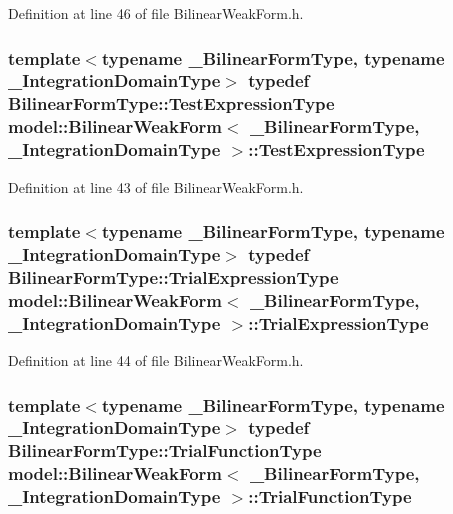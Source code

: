 Definition at line 46 of file Bilinear\+Weak\+Form.\+h.

\hypertarget{structmodel_1_1_bilinear_weak_form_acdfc10bd49650e2c484d222172834edd}{}
\subsubsection[{Test\+Expression\+Type}]{\setlength{\rightskip}{0pt plus 5cm}template$<$typename \+\_\+\+Bilinear\+Form\+Type, typename \+\_\+\+Integration\+Domain\+Type$>$ typedef Bilinear\+Form\+Type\+::\+Test\+Expression\+Type {\bf model\+::\+Bilinear\+Weak\+Form}$<$ \+\_\+\+Bilinear\+Form\+Type, \+\_\+\+Integration\+Domain\+Type $>$\+::{\bf Test\+Expression\+Type}}\label{structmodel_1_1_bilinear_weak_form_acdfc10bd49650e2c484d222172834edd}


Definition at line 43 of file Bilinear\+Weak\+Form.\+h.

\hypertarget{structmodel_1_1_bilinear_weak_form_a259b56acf743f646cc86607685f70791}{}
\subsubsection[{Trial\+Expression\+Type}]{\setlength{\rightskip}{0pt plus 5cm}template$<$typename \+\_\+\+Bilinear\+Form\+Type, typename \+\_\+\+Integration\+Domain\+Type$>$ typedef Bilinear\+Form\+Type\+::\+Trial\+Expression\+Type {\bf model\+::\+Bilinear\+Weak\+Form}$<$ \+\_\+\+Bilinear\+Form\+Type, \+\_\+\+Integration\+Domain\+Type $>$\+::{\bf Trial\+Expression\+Type}}\label{structmodel_1_1_bilinear_weak_form_a259b56acf743f646cc86607685f70791}


Definition at line 44 of file Bilinear\+Weak\+Form.\+h.

\hypertarget{structmodel_1_1_bilinear_weak_form_a3c646b6d23c1e5dc29480fc04b6c9587}{}
\subsubsection[{Trial\+Function\+Type}]{\setlength{\rightskip}{0pt plus 5cm}template$<$typename \+\_\+\+Bilinear\+Form\+Type, typename \+\_\+\+Integration\+Domain\+Type$>$ typedef Bilinear\+Form\+Type\+::\+Trial\+Function\+Type {\bf model\+::\+Bilinear\+Weak\+Form}$<$ \+\_\+\+Bilinear\+Form\+Type, \+\_\+\+Integration\+Domain\+Type $>$\+::{\bf Trial\+Function\+Type}}\label{structmodel_1_1_bilinear_weak_form_a3c646b6d23c1e5dc29480fc04b6c9587}


